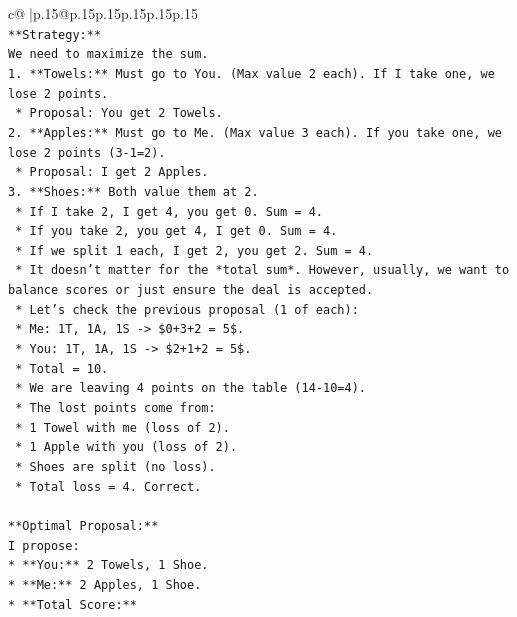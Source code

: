 \documentclass{article}
\begin{document}
{\begin{supertabular}{c@{$\;$}|p{.15\linewidth}@{}p{.15\linewidth}p{.15\linewidth}p{.15\linewidth}p{.15\linewidth}p{.15\linewidth}}
{{{\\ 
\texttt{**Strategy:**} \\
\texttt{We need to maximize the sum.} \\
\texttt{1.  **Towels:** Must go to You. (Max value 2 each). If I take one, we lose 2 points.} \\
\texttt{    *   Proposal: You get 2 Towels.} \\
\texttt{2.  **Apples:** Must go to Me. (Max value 3 each). If you take one, we lose 2 points (3{-}1=2).} \\
\texttt{    *   Proposal: I get 2 Apples.} \\
\texttt{3.  **Shoes:** Both value them at 2.} \\
\texttt{    *   If I take 2, I get 4, you get 0. Sum = 4.} \\
\texttt{    *   If you take 2, you get 4, I get 0. Sum = 4.} \\
\texttt{    *   If we split 1 each, I get 2, you get 2. Sum = 4.} \\
\texttt{    *   It doesn't matter for the *total sum*. However, usually, we want to balance scores or just ensure the deal is accepted.} \\
\texttt{    *   Let's check the previous proposal (1 of each):} \\
\texttt{        *   Me: 1T, 1A, 1S {-}> \$0+3+2 = 5\$.} \\
\texttt{        *   You: 1T, 1A, 1S {-}> \$2+1+2 = 5\$.} \\
\texttt{        *   Total = 10.} \\
\texttt{        *   We are leaving 4 points on the table (14{-}10=4).} \\
\texttt{        *   The lost points come from:} \\
\texttt{            *   1 Towel with me (loss of 2).} \\
\texttt{            *   1 Apple with you (loss of 2).} \\
\texttt{            *   Shoes are split (no loss).} \\
\texttt{            *   Total loss = 4. Correct.} \\
\\ 
\texttt{**Optimal Proposal:**} \\
\texttt{I propose:} \\
\texttt{*   **You:** 2 Towels, 1 Shoe.} \\
\texttt{*   **Me:** 2 Apples, 1 Shoe.} \\
\texttt{*   **Total Score:**} \\
}}}
\end{supertabular}}
\end{document}
